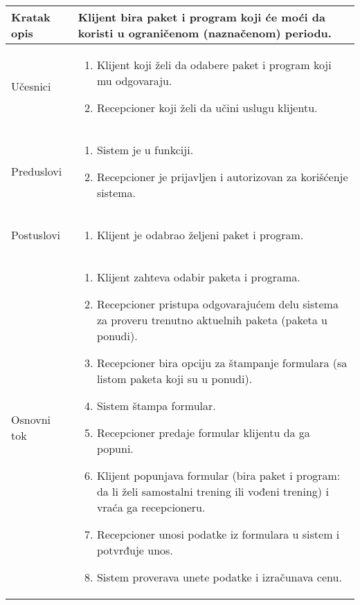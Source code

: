 \documentclass[../main.tex]{subfiles}
\begin{document}
\begin{longtable}{| p{} | p{} |} 

\hline
    Kratak opis & Klijent bira paket i program koji će moći da koristi u ograničenom (naznačenom) periodu. \\ 
\hline    
    Učesnici & 
    	\begin{enumerate}
        \item Klijent koji želi da odabere paket i program koji mu odgovaraju.
        \item Recepcioner koji želi da učini uslugu klijentu.
     \end{enumerate}\\
\hline
   Preduslovi & \begin{enumerate}
       \item Sistem je u funkciji.
       \item Recepcioner je prijavljen i autorizovan za korišćenje sistema.
   \end{enumerate}\\
\hline  
    Postuslovi & \begin{enumerate}
        \item Klijent je odabrao željeni paket i program.
    \end{enumerate}\\
\hline
    Osnovni tok & \begin{enumerate}
        \item Klijent zahteva odabir paketa i programa.
        \item Recepcioner pristupa odgovarajućem delu sistema za proveru trenutno aktuelnih paketa (paketa u ponudi).
        \item Recepcioner bira opciju za štampanje formulara (sa listom paketa koji su u ponudi).
        \item Sistem štampa formular.
        \item Recepcioner predaje formular klijentu da ga popuni.
        \item Klijent popunjava formular (bira paket i program: da li želi samostalni trening ili vođeni trening) i vraća ga recepcioneru.
        \item Recepcioner unosi podatke iz formulara u sistem i potvrđuje unos.
        \item Sistem proverava unete podatke i izračunava cenu.

\end{enumerate}
\end{longtable}
\end{document}
